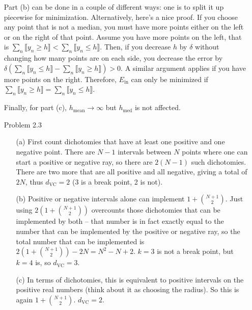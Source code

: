\documentclass[10pt]{article}
\DeclarePairedDelimiter\floor{\lfloor}{\rfloor}
\begin{document}
\begin{enumerate}
Part (b) can be done in a couple of different ways: one is to split it
up piecewise for minimization. Alternatively, here's a nice proof. 
If you choose any point that is not a median, you must have more points
either on the left or on the right of that point. Assume you have more
points on the left, that is $\sum_{n} \llbracket y_n \geq h
\rrbracket < \sum_{n} \llbracket y_n \leq h \rrbracket$. Then, if
you decrease $h$ by $\delta$ without changing how many points are on
each side, you decrease the error by $\delta (\sum_{n} \llbracket y_n
\leq h \rrbracket - \sum_{n} \llbracket y_n \geq h \rrbracket) > 0$. A
similar argument applies if you have more points on the
right. Therefore, $E_{\text{in}}$ can only be minimized if $\sum_{n} \llbracket y_n \geq h
\rrbracket = \sum_{n} \llbracket y_n \leq h \rrbracket$. 

  Finally, for part (c), $h_{\text{mean}} \rightarrow \infty$ but
  $h_{\text{med}}$ is not affected.


\item[Problem 2.3]
  \begin{itemize}
    \item[(a)] First count dichotomies that have at least one positive
      and one negative point. There are $N-1$ intervals between $N$
      points where one can start a positive or negative ray, so there
      are $2(N-1)$ such dichotomies. There are two more that are all
      positive and all negative, giving a total of $2N$, thus
      $d_{\text{VC}} = 2$ (3 is a break point, 2 is not).

    \item[(b)] Positive or negative intervals alone can implement $1 +
      \binom{N+1}{2}$. Just using $2(1 + \binom{N+1}{2})$ overcounts
      those dichotomies that can be implemented by both -- that number
      is in fact exactly equal to the number that can be implemented
      by the positive or negative ray, so the total number that can be
      implemented is $2(1 + \binom{N+1}{2}) - 2N = N^2 - N +2$. $k=3$
      is not a break point, but $k=4$ is, so $d_{\text{VC}} = 3$. 

    \item[(c)] In terms of dichotomies, this is equivalent to positive
      intervals on the positive real numbers (think about it as
      choosing the radius). So this is again $1 + \binom{N+1}{2}$.
      $d_{\text{VC}} = 2$. 

     \end{itemize} 

\end{enumerate}
\end{document}
